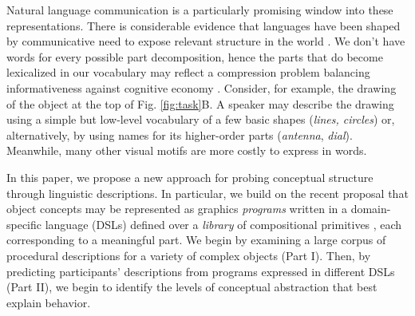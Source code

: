 \documentclass[10pt,letterpaper]{article}
\begin{document}
Natural language communication is a particularly promising window into these representations. 
There is considerable evidence that languages have been shaped by communicative need to expose relevant structure in the world \cite{rosch1976basic}. 
We don't have words for every possible part decomposition, hence the parts that do become lexicalized in our vocabulary may reflect a compression problem balancing informativeness against cognitive economy \cite{regier201511,kirby2015compression,zaslavsky2018efficient}.
Consider, for example, the drawing of the object at the top of Fig. \ref{fig:task}B.
A speaker may describe the drawing using a simple but low-level vocabulary of a few basic shapes (\textit{lines, circles}) or, alternatively, by using names for its higher-order parts (\textit{antenna}, \textit{dial}). 
Meanwhile, many other visual motifs are more costly to express in words.

In this paper, we propose a new approach for probing conceptual structure through linguistic descriptions.
In particular, we build on the recent proposal that object concepts may be represented as graphics \textit{programs} written in a domain-specific language (DSLs) defined over a \emph{library} of compositional primitives , each corresponding to a meaningful part.
We begin by examining a large corpus of procedural descriptions for a variety of complex objects (Part I). 
Then, by predicting participants' descriptions from programs expressed in different DSLs (Part II), we begin to identify the levels of conceptual abstraction that best explain behavior.


\end{document}
